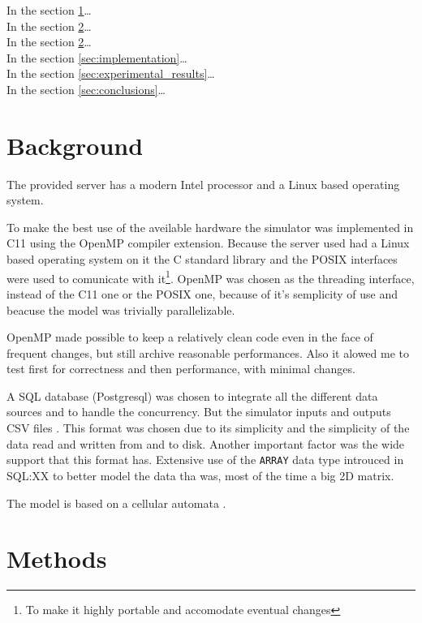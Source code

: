 \documentclass[draft]{article}
\begin{document}
In the section \ref{sec:background}\dots\\
In the section \ref{sec:methods}\dots\\
In the section \ref{sec:methods}\dots\\
In the section \ref{sec:implementation}\dots\\
In the section \ref{sec:experimental_results}\dots\\
In the section \ref{sec:conclusions}\dots\\

\section{Background}\label{sec:background}

The provided server has a modern Intel processor and a Linux based operating
system.

To make the best use of the aveilable hardware the simulator was implemented in
C11 using the OpenMP compiler extension.  Because the server used had a Linux
based operating system on it the C standard library and the POSIX interfaces
were used to comunicate with it\footnote{To make it highly portable and
accomodate eventual changes}. OpenMP was chosen as the threading interface,
instead of the C11 one or the POSIX one, because of it's semplicity of use and
beacuse the model was trivially parallelizable.

OpenMP made possible to keep a relatively clean code even in the face of
frequent changes, but still archive reasonable performances. Also it alowed me
to test first for correctness and then performance, with minimal changes.

A SQL database (Postgresql) was chosen to integrate all the different data
sources and to handle the concurrency. But the simulator inputs and outputs CSV
files \cite{csv}. This format was chosen due to its simplicity and the
simplicity of the data read and written from and to disk. Another important
factor was the wide support that this format has. Extensive use of the
\texttt{ARRAY} data type introuced in SQL:XX to better model the data tha was,
most of the time a big 2D matrix.

The model is based on a cellular automata \cite{gol}.

\section{Methods}\label{sec:methods}
\end{document}

